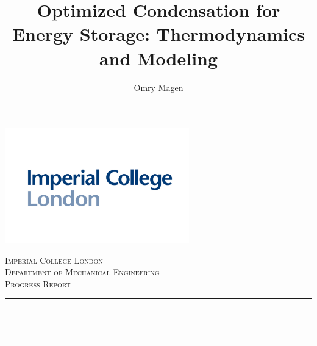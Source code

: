 \begin{titlepage}
\title{Optimized Condensation for Energy Storage:
Thermodynamics and Modeling}
\author{Omry Magen}

\newcommand{\HRule}{\rule{\linewidth}{0.5mm}} %


\includegraphics[width=8cm]{Figures/Logo.png}\\[1cm] 
 

\center %



\textsc{\Large Imperial College London}\\[0.5cm] %
\textsc{\large Department of Mechanical Engineering}\\[0.5cm] %
\textsc{\LARGE Progress Report}\\[1cm] %

\makeatletter
\HRule \\[0.4cm]
{ \huge \bfseries \@title}\\[0.4cm] %
\HRule \\[1.5cm]
 





\end{titlepage}
